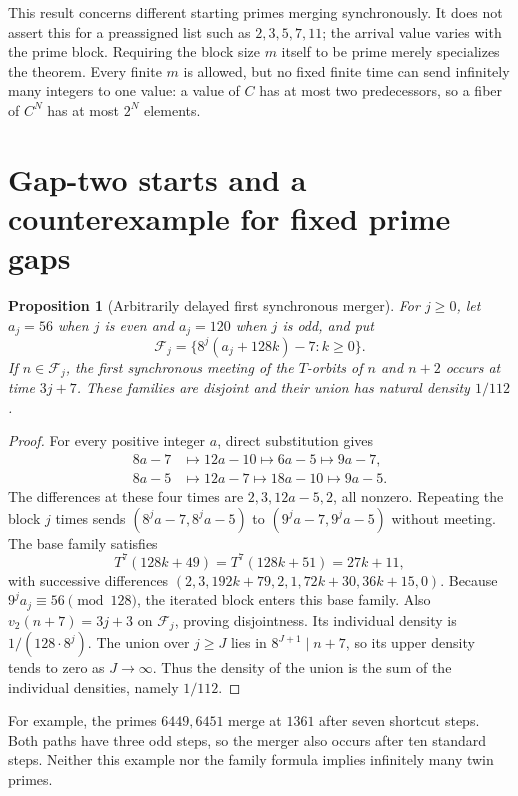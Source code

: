 \documentclass[11pt,a4paper]{article}
\newtheorem{proposition}[theorem]{Proposition}
\theoremstyle{definition}
\theoremstyle{remark}
\numberwithin{equation}{section}
\begin{document}
This result concerns different starting primes merging synchronously.
It does not assert this for a preassigned list such as $2,3,5,7,11$;
the arrival value varies with the prime block. Requiring the block size
$m$ itself to be prime merely specializes the theorem. Every finite
$m$ is allowed, but no fixed finite time can send infinitely many
integers to one value: a value of $C$ has at most two predecessors, so a
fiber of $C^N$ has at most $2^N$ elements.

\section{Gap-two starts and a counterexample for fixed prime gaps}
\label{A:sec:audited-pairs}
\begin{proposition}[Arbitrarily delayed first synchronous merger]
For $j\ge0$, let $a_j=56$ when $j$ is even and $a_j=120$ when $j$ is odd,
and put
\[
 \mathcal F_j=\{8^j(a_j+128k)-7:k\ge0\}.
\]
If $n\in\mathcal F_j$, the first synchronous meeting of the $T$-orbits
of $n$ and $n+2$ occurs at time $3j+7$. These families are disjoint and
their union has natural density $1/112$.
\end{proposition}
\begin{proof}
For every positive integer $a$, direct substitution gives
\begin{align*}
8a-7&\longmapsto12a-10\longmapsto6a-5\longmapsto9a-7,\\
8a-5&\longmapsto12a-7\longmapsto18a-10\longmapsto9a-5.
\end{align*}
The differences at these four times are $2,3,12a-5,2$, all nonzero.
Repeating the block $j$ times sends
$(8^ja-7,8^ja-5)$ to $(9^ja-7,9^ja-5)$ without meeting.
The base family satisfies
\[
 T^7(128k+49)=T^7(128k+51)=27k+11,
\]
with successive differences
$(2,3,192k+79,2,1,72k+30,36k+15,0)$.
Because $9^ja_j\equiv56\pmod{128}$, the iterated block enters this
base family. Also $v_2(n+7)=3j+3$ on $\mathcal F_j$, proving
disjointness. Its individual density is $1/(128\cdot8^j)$.
The union over $j\ge J$ lies in $8^{J+1}\mid n+7$, so its upper density
tends to zero as $J\to\infty$. Thus the density of the union is the
sum of the individual densities, namely $1/112$.
\end{proof}
For example, the primes $6449,6451$ merge at $1361$ after seven
shortcut steps. Both paths have three odd steps, so the merger also
occurs after ten standard steps. Neither this example nor the family
formula implies infinitely many twin primes.
\end{document}
